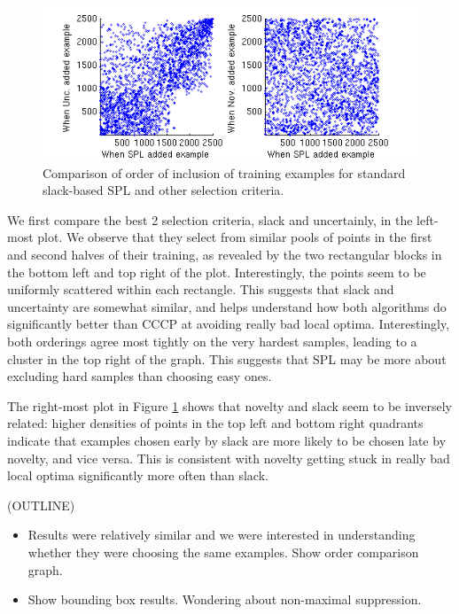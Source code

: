 \documentclass{article}
\begin{document}
\begin{figure}
\includegraphics{ordercomp.png}
\caption{Comparison of order of inclusion of training examples for standard slack-based SPL and other selection criteria.  }
\label{fig:order}
\end{figure}

We first compare the best 2 selection criteria, slack and uncertainly, in the left-most plot.  We observe that they select from similar pools of points in the first and second halves of their training, as revealed by the two rectangular blocks in the bottom left and top right of the plot.  Interestingly, the points seem to be uniformly scattered within each rectangle.  This suggests that slack and uncertainty are somewhat similar, and helps understand how both algorithms do significantly better than {\sc CCCP} at avoiding really bad local optima.  Interestingly, both orderings agree most tightly on the very hardest samples, leading to a cluster in the top right of the graph.  This suggests that SPL may be more about excluding hard samples than choosing easy ones.

The right-most plot in Figure \ref{fig:order} shows that novelty and slack seem to be inversely related: higher densities of points in the top left and bottom right quadrants indicate that examples chosen early by slack are more likely to be chosen late by novelty, and vice versa. This is consistent with novelty getting stuck in really bad local optima significantly more often than slack.

(OUTLINE)
\begin{itemize}

\item Results were relatively similar and we were interested in understanding whether they were choosing the same examples. Show order comparison graph.
\item Show bounding box results. Wondering about non-maximal suppression. 
\end{itemize}
\end{document}
